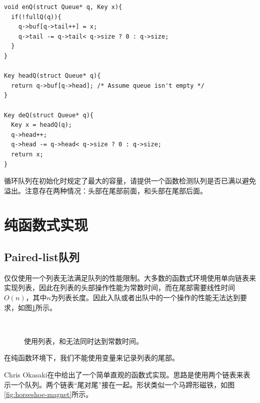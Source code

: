 \documentclass[UTF8]{article}
\begin{document}
\begin{lstlisting}
void enQ(struct Queue* q, Key x){
  if(!fullQ(q)){
    q->buf[q->tail++] = x;
    q->tail -= q->tail< q->size ? 0 : q->size;
  }
}

Key headQ(struct Queue* q){
  return q->buf[q->head]; /* Assume queue isn't empty */
}

Key deQ(struct Queue* q){
  Key x = headQ(q);
  q->head++;
  q->head -= q->head< q->size ? 0 : q->size;
  return x;
}
\end{lstlisting}

\begin{Exercise}
循环队列在初始化时规定了最大的容量，请提供一个函数检测队列是否已满以避免溢出。注意存在两种情况：头部在尾部前面，和头部在尾部后面。
\end{Exercise}

\section{纯函数式实现}

\subsection{Paired-list队列}

仅仅使用一个列表无法满足队列的性能限制。大多数的函数式环境使用单向链表来实现列表，因此在列表的头部操作性能为常数时间，而在尾部需要线性时间$O(n)$，其中$n$为列表长度。因此入队或者出队中的一个操作的性能无法达到要求，如图\ref{fig:linked-list-queue}所示。

\begin{figure}[htbp]
  \centering
   \\
  \caption{使用列表，和无法同时达到常数时间。 } \label{fig:linked-list-queue}
\end{figure}

在纯函数环境下，我们不能使用变量来记录列表的尾部。

Chris Okasaki在\cite{okasaki-book}中给出了一个简单直观的函数式实现。思路是使用两个链表来表示一个队列。两个链表“尾对尾”接在一起。形状类似一个马蹄形磁铁，如图\ref{fig:horseshoe-magnet}所示。
\end{document}
